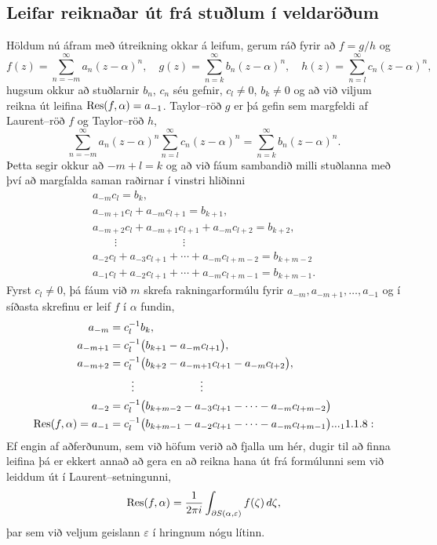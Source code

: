 \subsection*{Leifar reiknaðar út frá stuðlum í veldaröðum}

Höldum nú áfram með útreikning okkar á leifum, gerum ráð fyrir að
$f=g/h$ og  
 $$f(z)=\sum\limits_{n=-m}^{\infty}a_n(z-\alpha)^n, \quad
g(z)=\sum\limits_{n=k}^{\infty}b_n(z-\alpha)^n, \quad
h(z)=\sum\limits_{n=l}^{\infty}c_n(z-\alpha)^n, 
 $$
hugsum okkur að stuðlarnir $b_n$, $c_n$ séu gefnir, $c_l\neq 0$,
$b_k\neq 0$  og að við
viljum reikna út leifina ${\operatorname{Res}}(f,\alpha)=a_{-1}$.  
Taylor--röð  $g$ er þá gefin sem
margfeldi af Laurent--röð $f$ og Taylor--röð $h$,
 $$
\sum\limits_{n=-m}^{\infty}a_n(z-\alpha)^n
\sum\limits_{n=l}^{\infty}c_n(z-\alpha)^n=
\sum\limits_{n=k}^{\infty}b_n(z-\alpha)^n.
$$ 
Þetta segir okkur að $-m+l=k$ og að við fáum sambandið milli
stuðlanna með því að margfalda saman raðirnar í vinstri hliðinni
\begin{gather*}
a_{-m}c_l=b_k,\\
a_{-m+1}c_l+a_{-m}c_{l+1}=b_{k+1},\\
a_{-m+2}c_l+a_{-m+1}c_{l+1}+a_{-m}c_{l+2}=b_{k+2},\\
\qquad \vdots\qquad\qquad\qquad\vdots\\
a_{-2}c_l+a_{-3}c_{l+1}+\cdots+a_{-m}c_{l+m-2}=b_{k+m-2}\\
a_{-1}c_l+a_{-2}c_{l+1}+\cdots+a_{-m}c_{l+m-1}=b_{k+m-1}.
\end{gather*}
Fyrst $c_l\neq 0$, þá fáum við $m$ skrefa rakningarformúlu fyrir $a_{-m},
a_{-m+1},\dots, a_{-1}$ og í síðasta skrefinu er leif $f$ í $\alpha$
fundin,
\begin{align*}
a_{-m}&=c_l^{-1}b_k,\\
a_{-m+1}&=c_l^{-1}\big(b_{k+1}
-a_{-m}c_{l+1}\big),\\
a_{-m+2}&=c_l^{-1}\big(b_{k+2}
-a_{-m+1}c_{l+1}-a_{-m}c_{l+2}\big),\\
&\qquad \vdots\qquad\qquad\qquad\vdots\\
a_{-2}&=c_l^{-1}\big(b_{k+m-2}
-a_{-3}c_{l+1}-\cdots-a_{-m}c_{l+m-2}\big)\\
\Res(f,\alpha)=a_{-1}&=c_l^{-1}\big(
b_{k+m-1}-a_{-2}c_{l+1}-\cdots-a_{-m}c_{l+m-1}\big).

.. _11.1.8:

\end{align*}
Ef engin af aðferðunum, sem við höfum verið að fjalla um hér, dugir
til að finna leifina þá er ekkert annað að gera en að reikna hana út frá
formúlunni sem við leiddum út í Laurent--setningunni,
$$
{\operatorname{Res}}(f,\alpha) = \dfrac 1{2\pi i}\int_{\partial
S(\alpha,\varepsilon)} f(\zeta)\, d\zeta,
$$
þar sem við veljum geislann $\varepsilon$ í hringnum nógu lítinn.


